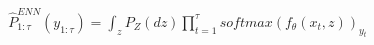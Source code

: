 \documentclass[preview]{standalone}
\begin{document}
\begin{align*}
\hat{P}_{1:\tau}^{ENN} (y_{1:\tau}) = \int_z P_Z(dz)\prod_{t=1}^{\tau} softmax (f_\theta (x_t, z))_{y_t}
\end{align*}
\end{document}
